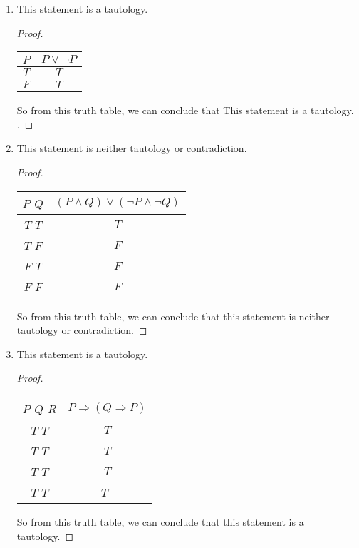\documentclass{article}
\begin{document}
\begin{enumerate}
\begin{enumerate}
\begin{proof}
                So from this truth table, we can conclude that this statement is a contradiction..
            \end{proof}
            \item 
            This statement is a tautology.
            \begin{proof}
                \begin{tabular}{c|c} $P$ & $P \vee \neg P$\\\hline
                    $T$ & $T$\\
                    $F$ & $T$\\

                \end{tabular}

                So from this truth table, we can conclude that This statement is a tautology.                .
            \end{proof}
            \item 
            This statement is neither tautology or contradiction.
            \begin{proof}
                \begin{tabular}{c|c} $P$ $Q$ & $(P \wedge Q) \vee (\neg P \wedge \neg Q)$\\\hline
                    $T$ $T$ & $T$\\
                    $T$ $F$ & $F$\\
                    $F$ $T$ & $F$\\
                    $F$ $F$ & $F$\\
                \end{tabular}

                So from this truth table, we can conclude that this statement is neither tautology or contradiction.
            \end{proof}
            \item 
            This statement is a tautology.
            \begin{proof}
                \begin{tabular}{c|c} $P$ $Q$ $R$ & $P \Rightarrow (Q \Rightarrow P)$\\\hline
                    $T$ $T$ & $T$\\
                    $T$ $T$ & $T$\\
                    $T$ $T$ & $T$\\
                    $T$ $T$ & $T$\
                \end{tabular}

                So from this truth table, we can conclude that this statement is a tautology.
            \end{proof}
        \end{enumerate}
    \end{enumerate}
\end{document}
